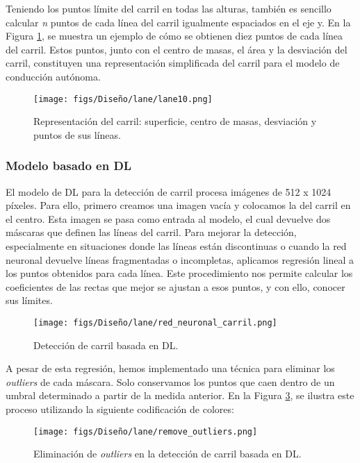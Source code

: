 Teniendo los puntos límite del carril en todas las alturas, también es sencillo calcular \textit{n} puntos de cada línea del carril igualmente espaciados en el eje y. En la Figura \ref{fig:puntos_carril}, se muestra un ejemplo de cómo se obtienen diez puntos de cada línea del carril. Estos puntos, junto con el centro de masas, el área y la desviación del carril, constituyen una representación simplificada del carril para el modelo de conducción autónoma.

\begin{figure}[ht]
  \centering
  \texttt{[image: figs/Diseño/lane/lane10.png]}
  \caption{Representación del carril: superficie, centro de masas, desviación y puntos de sus líneas.}
  \label{fig:puntos_carril}
\end{figure}

\subsubsection{Modelo basado en \ac{DL}}

El modelo de \ac{DL} para la detección de carril procesa imágenes de 512 x 1024 píxeles. Para ello, primero creamos una imagen vacía y colocamos la del carril en el centro. Esta imagen se pasa como entrada al modelo, el cual devuelve dos máscaras que definen las líneas del carril. Para mejorar la detección, especialmente en situaciones donde las líneas están discontinuas o cuando la red neuronal devuelve líneas fragmentadas o incompletas, aplicamos regresión lineal a los puntos obtenidos para cada línea. Este procedimiento nos permite calcular los coeficientes de las rectas que mejor se ajustan a esos puntos, y con ello, conocer sus límites.

\begin{figure}[ht]
  \centering
  \texttt{[image: figs/Diseño/lane/red\_neuronal\_carril.png]}
  \caption{Detección de carril basada en \ac{DL}.}
  \label{fig:dl_final_carril}
\end{figure}

A pesar de esta regresión, hemos implementado una técnica para eliminar los \textit{outliers} de cada máscara. Solo conservamos los puntos que caen dentro de un umbral determinado a partir de la medida anterior. En la Figura \ref{fig:outliers}, se ilustra este proceso utilizando la siguiente codificación de colores:

\begin{figure}[ht]
  \centering
  \texttt{[image: figs/Diseño/lane/remove\_outliers.png]}
  \caption{Eliminación de \textit{outliers} en la detección de carril basada en \ac{DL}.}
  \label{fig:outliers}
\end{figure}

